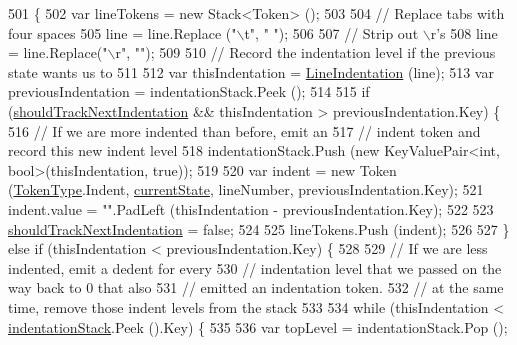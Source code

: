 \begin{DoxyCode}
501         \{
502             var lineTokens = \textcolor{keyword}{new} Stack<Token> ();
503 
504             \textcolor{comment}{// Replace tabs with four spaces}
505             line = line.Replace (\textcolor{stringliteral}{"\(\backslash\)t"}, \textcolor{stringliteral}{"    "});
506 
507             \textcolor{comment}{// Strip out \(\backslash\)r's}
508             line = line.Replace(\textcolor{stringliteral}{"\(\backslash\)r"}, \textcolor{stringliteral}{""});
509 
510             \textcolor{comment}{// Record the indentation level if the previous state wants us to}
511 
512             var thisIndentation = \hyperlink{a00101_a4079b10b099e5d85f5482f9e7eac4179}{LineIndentation} (line);
513             var previousIndentation = indentationStack.Peek ();
514 
515             \textcolor{keywordflow}{if} (\hyperlink{a00101_ac670aac2245cbd4694dfbd5b69313218}{shouldTrackNextIndentation} && thisIndentation > 
      previousIndentation.Key) \{
516                 \textcolor{comment}{// If we are more indented than before, emit an}
517                 \textcolor{comment}{// indent token and record this new indent level}
518                 indentationStack.Push (\textcolor{keyword}{new} KeyValuePair<int, bool>(thisIndentation, \textcolor{keyword}{true}));
519 
520                 var indent = \textcolor{keyword}{new} Token (\hyperlink{a00031_a301aa7c866593a5b625a8fc158bbeace}{TokenType}.Indent, \hyperlink{a00101_ac90b7dce8103425a148f9e8588f14137}{currentState}, lineNumber, 
      previousIndentation.Key);
521                 indent.value = \textcolor{stringliteral}{""}.PadLeft (thisIndentation - previousIndentation.Key);
522 
523                 \hyperlink{a00101_ac670aac2245cbd4694dfbd5b69313218}{shouldTrackNextIndentation} = \textcolor{keyword}{false};
524 
525                 lineTokens.Push (indent);
526 
527             \} \textcolor{keywordflow}{else} \textcolor{keywordflow}{if} (thisIndentation < previousIndentation.Key) \{
528 
529                 \textcolor{comment}{// If we are less indented, emit a dedent for every}
530                 \textcolor{comment}{// indentation level that we passed on the way back to 0 that also}
531                 \textcolor{comment}{// emitted an indentation token.}
532                 \textcolor{comment}{// at the same time, remove those indent levels from the stack}
533 
534                 \textcolor{keywordflow}{while} (thisIndentation < \hyperlink{a00101_a6631a1b1a9109258ab18927e7587ff9b}{indentationStack}.Peek ().Key) \{
535 
536                     var topLevel = indentationStack.Pop ();

\end{DoxyCode}
